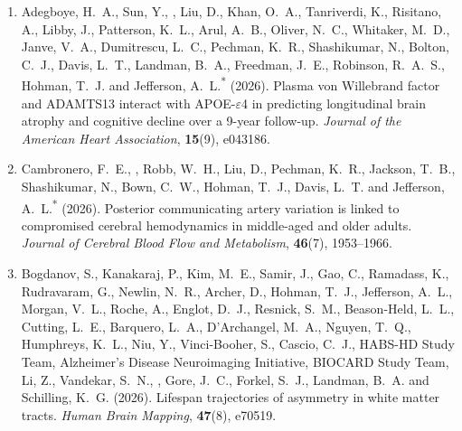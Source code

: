\begin{enumerate}[resume=journalpubs]

\item\begin{pubentry} Adegboye, H.\ A., Sun, Y., \PZnot{}, Liu, D., Khan, O.\ A., Tanriverdi, K., Risitano, A., Libby, J., Patterson, K.\ L., Arul, A.\ B., Oliver, N.\ C., Whitaker, M.\ D., Janve, V.\ A., Dumitrescu, L.\ C., Pechman, K.\ R., Shashikumar, N., Bolton, C.\ J., Davis, L.\ T., Landman, B.\ A., Freedman, J.\ E., Robinson, R.\ A.\ S., Hohman, T.\ J. and Jefferson, A.\ L.\textsuperscript{*} (2026). Plasma von Willebrand factor and ADAMTS13 interact with APOE-$\varepsilon$4 in predicting longitudinal brain atrophy and cognitive decline over a 9-year follow-up. \emph{Journal of the American Heart Association}, \textbf{15}(9), e043186.

\par\end{pubentry}
\item\begin{pubentry} Cambronero, F.\ E., \PZnot{}, Robb, W.\ H., Liu, D., Pechman, K.\ R., Jackson, T.\ B., Shashikumar, N., Bown, C.\ W., Hohman, T.\ J., Davis, L.\ T. and Jefferson, A.\ L.\textsuperscript{*} (2026). Posterior communicating artery variation is linked to compromised cerebral hemodynamics in middle-aged and older adults. \emph{Journal of Cerebral Blood Flow and Metabolism}, \textbf{46}(7), 1953--1966.

\par\end{pubentry}
\item\begin{pubentry} Bogdanov, S., Kanakaraj, P., Kim, M.\ E., Samir, J., Gao, C., Ramadass, K., Rudravaram, G., Newlin, N.\ R., Archer, D., Hohman, T.\ J., Jefferson, A.\ L., Morgan, V.\ L., Roche, A., Englot, D.\ J., Resnick, S.\ M., Beason-Held, L.\ L., Cutting, L.\ E., Barquero, L.\ A., D'Archangel, M.\ A., Nguyen, T.\ Q., Humphreys, K.\ L., Niu, Y., Vinci-Booher, S., Cascio, C.\ J., HABS-HD Study Team, Alzheimer's Disease Neuroimaging Initiative, BIOCARD Study Team, Li, Z., Vandekar, S.\ N., \PZnot{}, Gore, J.\ C., Forkel, S.\ J., Landman, B.\ A. and Schilling, K.\ G. (2026). Lifespan trajectories of asymmetry in white matter tracts. \emph{Human Brain Mapping}, \textbf{47}(8), e70519.


\end{pubentry}
\end{enumerate}
